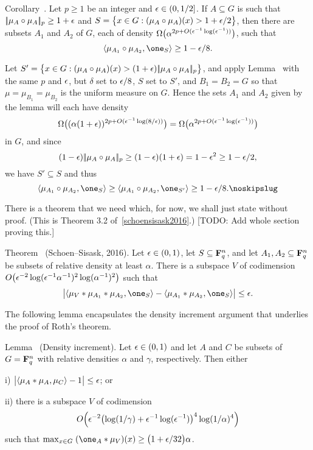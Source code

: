 \edef\deprandcorollary{\the\thmcount}
\proclaim Corollary~{\advthm}. Let $p\ge 1$ be an integer and $\epsilon\in (0,1/2]$. If $A\subseteq G$ is such that
$|\!|\mu_A\circ\mu_A|\!|_p \ge 1+\epsilon$ and
$S = \bigl\{x\in G: (\mu_A\circ\mu_A)(x) > 1+\epsilon/2\bigr\}$, then there are
subsets $A_1$ and $A_2$ of $G$, each of density $\Omega\bigl( \alpha^{2p+O(\epsilon^{-1}\log(\epsilon^{-1}))}\bigr)$,
such that
$$\langle \mu_{A_1}\circ\mu_{A_2}, \one_S\rangle \ge 1-\eps/8.$$

\proof Let $S' = \bigl\{x\in G : (\mu_A\circ\mu_A)(x) > (1+\epsilon)|\!|\mu_A\circ\mu_A|\!|_p\bigr\}$, and apply
Lemma~{\dependentrandom} with the same $p$ and $\epsilon$, but $\delta$ set to $\epsilon/8$, $S$ set to $S'$,
and $B_1 = B_2 = G$ so that $\mu = \mu_{B_1} = \mu_{B_2}$ is the uniform measure on $G$. Hence the
sets $A_1$ and $A_2$ given by the lemma will each have density
$$\Omega\bigl((\alpha(1+\epsilon))^{2p+O(\epsilon^{-1}\log(8/\epsilon))}\bigr)
=\Omega\bigl(\alpha^{2p+O(\epsilon^{-1}\log(\epsilon^{-1}))}\bigr)$$
in $G$, and since
$$(1-\epsilon)|\!|\mu_A\circ\mu_A|\!|_p \ge (1-\epsilon)(1+\epsilon) = 1-\epsilon^2 \ge 1-\epsilon/2,$$
we have $S'\subseteq S$ and thus
$$\langle \mu_{A_1}\circ\mu_{A_2}, \one_S\rangle \ge
\langle \mu_{A_1}\circ\mu_{A_2}, \one_{S'}\rangle \ge 1-\eps/8.\noskipslug$$

There is a theorem that we need which, for now, we shall just state without proof. (This is Theorem 3.2
of~\ref{schoensisask2016}.)
[TODO: Add whole section proving this.]

\edef\almostperiodicity{\the\thmcount}
\parenproclaim Theorem~{\advthm} (Schoen--Sisask, {\rm 2016}).
Let $\epsilon\in (0,1)$, let $S\subseteq {\bf F}_q^n$, and
let $A_1,A_2\subseteq {\bf F}_q^n$ be subsets
of relative density at least $\alpha$. There is a subspace $V$ of codimension
$O\bigl(\epsilon^{-2}\log(\epsilon^{-1}\alpha^{-1})^2\log(\alpha^{-1})^2\bigr)$
such that
$$\bigl| \langle \mu_V*\mu_{A_1}*\mu_{A_2}, \one_S\rangle -
 \langle \mu_{A_1}*\mu_{A_2}, \one_S\rangle\bigr| \le \eps.$$

The following lemma encapsulates the density increment argument that underlies the proof of Roth's theorem.

\parenproclaim Lemma~{\advthm} (Density increment). Let $\epsilon\in (0,1)$ and let $A$ and $C$
be subsets of $G ={\bf F}_q^n$ with relative densities $\alpha$ and $\gamma$, respectively. Then either
\medskip
\item{i)} $\bigl|\langle \mu_A*\mu_A,\mu_C\rangle-1\bigr| \le \epsilon$; or
\smallskip
\item{ii)} there is a subspace $V$ of codimension
$$O\Bigl(\epsilon^{-2}\bigl(\log(1/\gamma)+\epsilon^{-1}\log(\epsilon^{-1})\bigr)^4\log(1/\alpha)^4\Bigr)$$
such that $\max_{x\in G}\;(\one_A*\mu_V)(x) \ge \bigl(1+\eps/32\bigr)\alpha$.
\medskip

